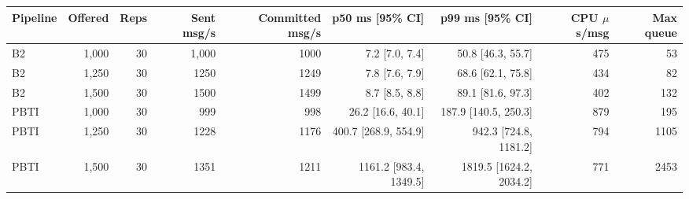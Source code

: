 \begin{tabular}{lrrrrrrrr}
\toprule
\textbf{Pipeline} & \textbf{Offered} & \textbf{Reps} & \textbf{Sent msg/s} & \textbf{Committed msg/s} & \textbf{p50 ms [95\% CI]} & \textbf{p99 ms [95\% CI]} & \textbf{CPU $\mu$s/msg} & \textbf{Max queue}\\
\midrule
B2 & 1{,}000 & 30 & 1{,}000 & 1000 & 7.2 [7.0, 7.4] & 50.8 [46.3, 55.7] & 475 & 53\\
B2 & 1{,}250 & 30 & 1250 & 1249 & 7.8 [7.6, 7.9] & 68.6 [62.1, 75.8] & 434 & 82\\
B2 & 1{,}500 & 30 & 1500 & 1499 & 8.7 [8.5, 8.8] & 89.1 [81.6, 97.3] & 402 & 132\\
PBTI & 1{,}000 & 30 & 999 & 998 & 26.2 [16.6, 40.1] & 187.9 [140.5, 250.3] & 879 & 195\\
PBTI & 1{,}250 & 30 & 1228 & 1176 & 400.7 [268.9, 554.9] & 942.3 [724.8, 1181.2] & 794 & 1105\\
PBTI & 1{,}500 & 30 & 1351 & 1211 & 1161.2 [983.4, 1349.5] & 1819.5 [1624.2, 2034.2] & 771 & 2453\\
\bottomrule
\end{tabular}